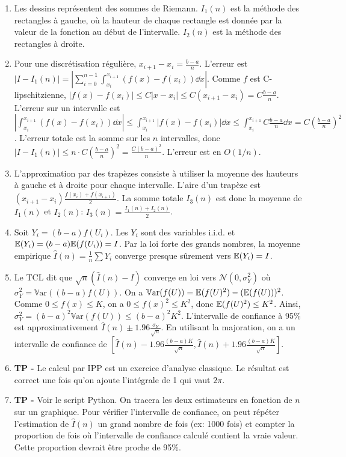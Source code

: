\documentclass[solutions]{exercices}
\begin{document}
\begin{solution}
\begin{enumerate}
    \item Les dessins représentent des sommes de Riemann. $I_1(n)$ est la méthode des rectangles à gauche, où la hauteur de chaque rectangle est donnée par la valeur de la fonction au début de l'intervalle. $I_2(n)$ est la méthode des rectangles à droite.
    \item Pour une discrétisation régulière, $x_{i+1}-x_i = \frac{b-a}{n}$. L'erreur est $|I - I_1(n)| = |\sum_{i=0}^{n-1} \int_{x_i}^{x_{i+1}} (f(x)-f(x_i)) \dd x|$.
    Comme $f$ est C-lipschitzienne, $|f(x)-f(x_i)| \leq C|x-x_i| \leq C(x_{i+1}-x_i) = C\frac{b-a}{n}$.
    L'erreur sur un intervalle est $|\int_{x_i}^{x_{i+1}} (f(x)-f(x_i)) \dd x| \leq \int_{x_i}^{x_{i+1}} |f(x)-f(x_i)| \dd x \leq \int_{x_i}^{x_{i+1}} C\frac{b-a}{n} \dd x = C(\frac{b-a}{n})^2$.
    L'erreur totale est la somme sur les $n$ intervalles, donc $|I - I_1(n)| \leq n \cdot C(\frac{b-a}{n})^2 = \frac{C(b-a)^2}{n}$. L'erreur est en $O(1/n)$.
    \item L'approximation par des trapèzes consiste à utiliser la moyenne des hauteurs à gauche et à droite pour chaque intervalle. L'aire d'un trapèze est $(x_{i+1}-x_i) \frac{f(x_i)+f(x_{i+1})}{2}$. La somme totale $I_3(n)$ est donc la moyenne de $I_1(n)$ et $I_2(n)$: $I_3(n) = \frac{I_1(n)+I_2(n)}{2}$.
    \item Soit $Y_i = (b-a)f(U_i)$. Les $Y_i$ sont des variables i.i.d. et $\mathbb{E}(Y_i) = (b-a)\mathbb{E}(f(U_i)) = I$. Par la loi forte des grands nombres, la moyenne empirique $\hat{I}(n) = \frac{1}{n} \sum Y_i$ converge presque sûrement vers $\mathbb{E}(Y_i) = I$.
    \item Le TCL dit que $\sqrt{n}(\hat{I}(n) - I)$ converge en loi vers $\mathcal{N}(0, \sigma_Y^2)$ où $\sigma_Y^2 = \mathbb{V}\mathrm{ar}((b-a)f(U))$.
    On a $\mathbb{V}\mathrm{ar}(f(U)) = \mathbb{E}(f(U)^2) - (\mathbb{E}(f(U)))^2$. Comme $0 \le f(x) \le K$, on a $0 \le f(x)^2 \le K^2$, donc $\mathbb{E}(f(U)^2) \le K^2$.
    Ainsi, $\sigma_Y^2 = (b-a)^2\mathbb{V}\mathrm{ar}(f(U)) \le (b-a)^2 K^2$.
    L'intervalle de confiance à 95\% est approximativement $\hat{I}(n) \pm 1.96 \frac{\sigma_Y}{\sqrt{n}}$. En utilisant la majoration, on a un intervalle de confiance de $[\hat{I}(n) - 1.96 \frac{(b-a)K}{\sqrt{n}}, \hat{I}(n) + 1.96 \frac{(b-a)K}{\sqrt{n}}]$.
    \item \textbf{TP -} Le calcul par IPP est un exercice d'analyse classique. Le résultat est correct une fois qu'on ajoute l'intégrale de 1 qui vaut $2\pi$.
    \item \textbf{TP -} Voir le script Python. On tracera les deux estimateurs en fonction de $n$ sur un graphique. Pour vérifier l'intervalle de confiance, on peut répéter l'estimation de $\hat{I}(n)$ un grand nombre de fois (ex: 1000 fois) et compter la proportion de fois où l'intervalle de confiance calculé contient la vraie valeur. Cette proportion devrait être proche de 95\%.
\end{enumerate}
\end{solution}
\end{document}
